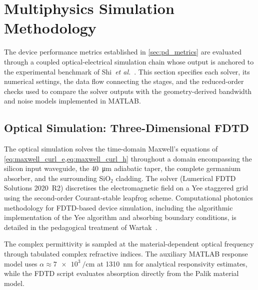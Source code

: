 \section[Simulation Methodology]{Multiphysics Simulation Methodology}
\label{sec:pd_simulation}

The device performance metrics established in \cref{sec:pd_metrics} are evaluated
through a coupled optical-electrical simulation chain whose output is anchored to
the experimental benchmark of Shi~\textit{et al.}~\cite{Shi2024}. This section
specifies each solver, its numerical settings, the data flow connecting the
stages, and the reduced-order checks used to compare the solver outputs with the
geometry-derived bandwidth and noise models implemented in MATLAB.

\subsection[Optical Simulation: FDTD]{Optical Simulation: Three-Dimensional FDTD}
\label{subsec:pd_fdtd}

The optical simulation solves the time-domain Maxwell's equations of
\cref{eq:maxwell_curl_e,eq:maxwell_curl_h} throughout a domain encompassing
the silicon input waveguide, the \SI{40}{\micro\metre} adiabatic taper, the
complete germanium absorber, and the surrounding SiO$_2$ cladding. The solver
(Lumerical FDTD Solutions 2020~R2) discretises the electromagnetic field on a
Yee staggered grid using the second-order Courant-stable leapfrog scheme.
Computational photonics methodology for FDTD-based device simulation, including
the algorithmic implementation of the Yee algorithm and absorbing boundary
conditions, is detailed in the pedagogical treatment of Wartak~\cite{Wartak2013}.

The complex permittivity is sampled at the material-dependent optical frequency
through tabulated complex refractive indices. The auxiliary MATLAB response
model uses $\alpha\approx\SI{7e3}{\per\centi\metre}$ at
\SI{1310}{\nano\metre} for analytical responsivity estimates, while the FDTD
script evaluates absorption directly from the Palik material model.

